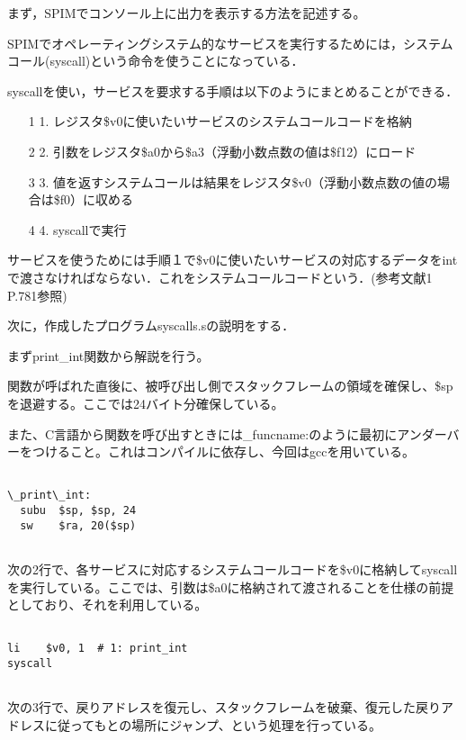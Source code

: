 \documentclass[a4j]{jarticle}
\begin{document}
まず，SPIMでコンソール上に出力を表示する方法を記述する。

SPIMでオペレーティングシステム的なサービスを実行するためには，システムコール(syscall)という命令を使うことになっている．

syscallを使い，サービスを要求する手順は以下のようにまとめることができる．

\begin{itemize}
\item[1]1. レジスタ\$v0に使いたいサービスのシステムコールコードを格納
\item[2]2. 引数をレジスタ\$a0から\$a3（浮動小数点数の値は\$f12）にロード
\item[3]3. 値を返すシステムコールは結果をレジスタ\$v0（浮動小数点数の値の場合は\$f0）に収める
\item[4]4. syscallで実行
\end{itemize}

サービスを使うためには手順１で\$v0に使いたいサービスの対応するデータをintで渡さなければならない．これをシステムコールコードという．(参考文献1 P.781参照)


次に，作成したプログラムsyscalls.sの説明をする．

まずprint\_int関数から解説を行う。


関数が呼ばれた直後に、被呼び出し側でスタックフレームの領域を確保し、\$spを退避する。ここでは24バイト分確保している。

また、C言語から関数を呼び出すときには\_funcname:のように最初にアンダーバーをつけること。これはコンパイルに依存し、今回はgccを用いている。　

{\baselineskip 3mm
\begin{verbatim}

\_print\_int:
  subu  $sp, $sp, 24
  sw    $ra, 20($sp)
 
\end{verbatim}
}

次の2行で、各サービスに対応するシステムコールコードを\$v0に格納してsyscallを実行している。ここでは、引数は\$a0に格納されて渡されることを仕様の前提としており、それを利用している。

{\baselineskip 3mm
\begin{verbatim}

li    $v0, 1  # 1: print_int
syscall
 
\end{verbatim}
}

次の3行で、戻りアドレスを復元し、スタックフレームを破棄、復元した戻りアドレスに従ってもとの場所にジャンプ、という処理を行っている。
\end{document}
